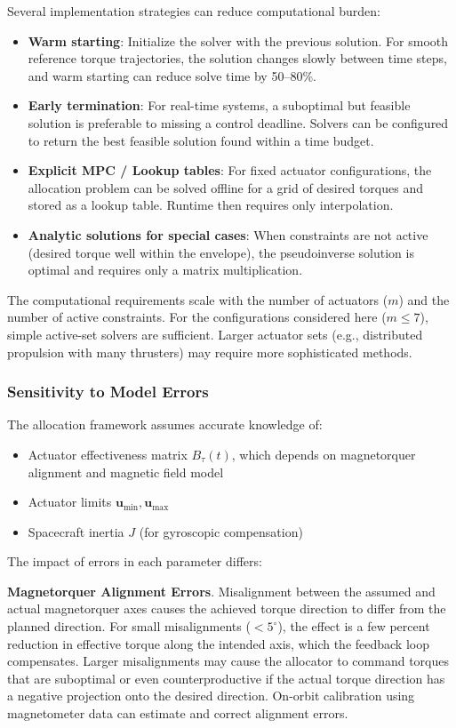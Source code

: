 \documentclass[conference]{IEEEtran}
\begin{document}
Several implementation strategies can reduce computational burden:
\begin{itemize}
    \item \textbf{Warm starting}: Initialize the solver with the previous solution. For smooth reference torque trajectories, the solution changes slowly between time steps, and warm starting can reduce solve time by 50--80\%.
    \item \textbf{Early termination}: For real-time systems, a suboptimal but feasible solution is preferable to missing a control deadline. Solvers can be configured to return the best feasible solution found within a time budget.
    \item \textbf{Explicit MPC / Lookup tables}: For fixed actuator configurations, the allocation problem can be solved offline for a grid of desired torques and stored as a lookup table. Runtime then requires only interpolation.
    \item \textbf{Analytic solutions for special cases}: When constraints are not active (desired torque well within the envelope), the pseudoinverse solution is optimal and requires only a matrix multiplication.
\end{itemize}

The computational requirements scale with the number of actuators ($m$) and the number of active constraints. For the configurations considered here ($m \leq 7$), simple active-set solvers are sufficient. Larger actuator sets (e.g., distributed propulsion with many thrusters) may require more sophisticated methods.

\subsubsection{Sensitivity to Model Errors}
The allocation framework assumes accurate knowledge of:
\begin{itemize}
    \item Actuator effectiveness matrix $B_\tau(t)$, which depends on magnetorquer alignment and magnetic field model
    \item Actuator limits $\mathbf{u}_{\min}, \mathbf{u}_{\max}$
    \item Spacecraft inertia $J$ (for gyroscopic compensation)
\end{itemize}

The impact of errors in each parameter differs:

\textbf{Magnetorquer Alignment Errors}. Misalignment between the assumed and actual magnetorquer axes causes the achieved torque direction to differ from the planned direction. For small misalignments ($<5^\circ$), the effect is a few percent reduction in effective torque along the intended axis, which the feedback loop compensates. Larger misalignments may cause the allocator to command torques that are suboptimal or even counterproductive if the actual torque direction has a negative projection onto the desired direction. On-orbit calibration using magnetometer data can estimate and correct alignment errors.
\end{document}
